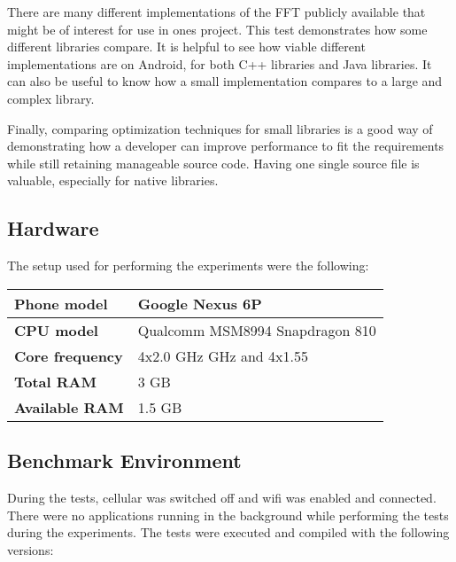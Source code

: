 There are many different implementations of the FFT publicly available that might be of interest for use in ones project. This test demonstrates how some different libraries compare. It is helpful to see how viable different implementations are on Android, for both C++ libraries and Java libraries. It can also be useful to know how a small implementation compares to a large and complex library.

Finally, comparing optimization techniques for small libraries is a good way of demonstrating how a developer can improve performance to fit the requirements while still retaining manageable source code. Having one single source file is valuable, especially for native libraries.

\subsection{Hardware}
The setup used for performing the experiments were the following:

\begin{table}[H]
    \centering
    \begin{tabular}{|l|l|}
        \hline
        \textbf{Phone model} & Google Nexus 6P\\
        \hline
        \textbf{CPU model} & Qualcomm MSM8994 Snapdragon 810\\
        \hline
        \textbf{Core frequency} & 4x2.0 GHz GHz and 4x1.55\\
        \hline
        \textbf{Total RAM} & 3 GB\\
        \hline
        \textbf{Available RAM} & 1.5 GB\\
        \hline
    \end{tabular}
\end{table}

\subsection{Benchmark Environment}
During the tests, cellular was switched off and wifi was enabled and connected. There were no applications running in the background while performing the tests during the experiments. The tests were executed and compiled with the following versions:

